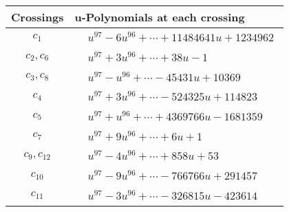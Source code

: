 \documentclass[1p]{elsarticle_modified}
\theoremstyle{definition}
\begin{document}
\begin{tabular}{m{50pt}|m{274pt}}
Crossings & \hspace{64pt}u-Polynomials at each crossing \\
\hline $$\begin{aligned}c_{1}\end{aligned}$$&$\begin{aligned}
&u^{97}-6 u^{96}+\cdots+11484641 u+1234962
\end{aligned}$\\
\hline $$\begin{aligned}c_{2},c_{6}\end{aligned}$$&$\begin{aligned}
&u^{97}+3 u^{96}+\cdots+38 u-1
\end{aligned}$\\
\hline $$\begin{aligned}c_{3},c_{8}\end{aligned}$$&$\begin{aligned}
&u^{97}- u^{96}+\cdots-45431 u+10369
\end{aligned}$\\
\hline $$\begin{aligned}c_{4}\end{aligned}$$&$\begin{aligned}
&u^{97}+3 u^{96}+\cdots-524325 u+114823
\end{aligned}$\\
\hline $$\begin{aligned}c_{5}\end{aligned}$$&$\begin{aligned}
&u^{97}+u^{96}+\cdots+4369766 u-1681359
\end{aligned}$\\
\hline $$\begin{aligned}c_{7}\end{aligned}$$&$\begin{aligned}
&u^{97}+9 u^{96}+\cdots+6 u+1
\end{aligned}$\\
\hline $$\begin{aligned}c_{9},c_{12}\end{aligned}$$&$\begin{aligned}
&u^{97}-4 u^{96}+\cdots+858 u+53
\end{aligned}$\\
\hline $$\begin{aligned}c_{10}\end{aligned}$$&$\begin{aligned}
&u^{97}-9 u^{96}+\cdots-766766 u+291457
\end{aligned}$\\
\hline $$\begin{aligned}c_{11}\end{aligned}$$&$\begin{aligned}
&u^{97}-3 u^{96}+\cdots-326815 u-423614
\end{aligned}$\\
\hline
\end{tabular}\\~\\
\end{document}
